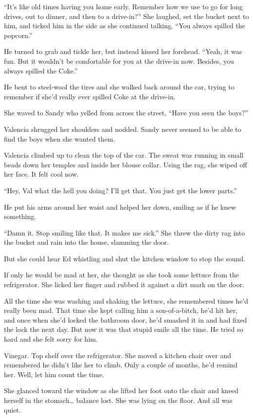 \documentclass[twoside,10pt]{book}
\begin{document}
``It's like old times having you home early. Remember how we use to go
for long drives, out to dinner, and then to a drive-in?'' She laughed,
set the bucket next to him, and ticked him in the side as she continued
talking. ``You always spilled the popcorn.''

He turned to grab and tickle her, but instead kissed her forehead.
``Yeah, it was fun. But it wouldn't be comfortable for you at the
drive-in now. Besides, you always spilled the Coke.''

He bent to steel-wool the tires and she walked back around the car,
trying to remember if she'd really ever spilled Coke at the drive-in.

She waved to Sandy who yelled from across the street, ``Have you seen
the boys?''

Valencia shrugged her shoulders and nodded. Sandy never seemed to be
able to find the boys when she wanted them.

Valencia climbed up to clean the top of the car. The sweat was running
in small beads down her temples and inside her blouse collar. Using the
rag, she wiped off her face. It felt cool now.

``Hey, Val what the hell you doing? I'll get that. You just get the
lower parts.''

He put his arms around her waist and helped her down, smiling as if he
knew something.

``Damn it. Stop smiling like that. It makes me sick.'' She threw the
dirty rag into the bucket and rain into the house, slamming the door.

But she could hear Ed whistling and shut the kitchen window to stop the
sound.

If only he would be mad at her, she thought as she took some lettuce
from the refrigerator. She licked her finger and rubbed it against a
dirt mark on the door.

All the time she was washing and shaking the lettuce, she remembered
times he'd really been mad. That time she kept calling him a
son-of-a-bitch, he'd hit her, and once when she'd locked the bathroom
door, he'd smashed it in and had fixed the lock the next day. But now it
was that stupid smile all the time. He tried so hard and she felt sorry
for him.

Vinegar. Top shelf over the refrigerator. She moved a kitchen chair over
and remembered he didn't like her to climb. Only a couple of months,
he'd remind her. Well, let him count the time.

She glanced toward the window as she lifted her foot onto the chair and
kneed herself in the stomach\ldots{} balance lost. She was lying on the
floor. And all was quiet.
\end{document}
